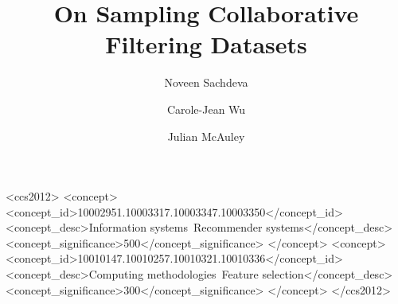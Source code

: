 \documentclass[sigconf]{acmart}
\begin{document}
\fancyhead{}

\title{On Sampling Collaborative Filtering Datasets}

\author{Noveen Sachdeva}

\author{Carole-Jean Wu}

\author{Julian McAuley}

\renewcommand{\shortauthors}{Sachdeva, Wu, and McAuley}

\begin{abstract}
  
\end{abstract}


\begin{CCSXML}
<ccs2012>
<concept>
<concept_id>10002951.10003317.10003347.10003350</concept_id>
<concept_desc>Information systems~Recommender systems</concept_desc>
<concept_significance>500</concept_significance>
</concept>
<concept>
<concept_id>10010147.10010257.10010321.10010336</concept_id>
<concept_desc>Computing methodologies~Feature selection</concept_desc>
<concept_significance>300</concept_significance>
</concept>
</ccs2012>
\end{CCSXML}
\end{document}
